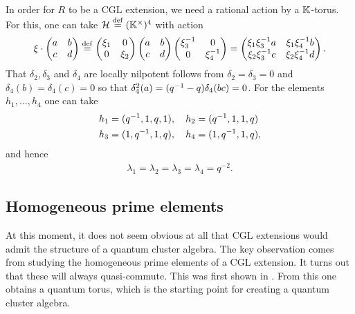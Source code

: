 \begin{example}
	In order for $R$ to be a CGL extension, we need a rational action by a $\mathbb{K}$-torus.
	For this, one can take $\mathcal{H} \overset{\mathrm{def}}{=} (\mathbb{K}^\times)^4$ with action
	\begin{equation*}
		\xi \cdot \begin{pmatrix}
			a & b \\
			c & d
		\end{pmatrix}
		\overset{\mathrm{def}}{=} \begin{pmatrix}
			\xi_1 & 0     \\
			0     & \xi_2
		\end{pmatrix}
		\begin{pmatrix}
			a & b \\
			c & d
		\end{pmatrix}
		\begin{pmatrix}
			\xi_3^{-1} & 0         \\
			0         & \xi_4^{-1}
		\end{pmatrix}
		= \begin{pmatrix}
			\xi_1\xi_3^{-1} a & \xi_1\xi_4^{-1} b \\
			\xi_2\xi_3^{-1} c & \xi_2\xi_4^{-1} d
		\end{pmatrix}.
	\end{equation*}
	That $\delta_2, \delta_3$ and $\delta_4$ are locally nilpotent follows from $\delta_2 =
		\delta_3 = 0$ and $\delta_4(b) = \delta_4(c) = 0$ so that $\delta_4^2(a) = (q^{-1} -
		q)\delta_4(bc) = 0$. For the elements $h_1, \dots, h_4$ one can take
	\begin{align*}
		 & h_1 = (q^{-1}, 1, q, 1),\quad h_2 = (q^{-1}, 1,1,q) \\
		 & h_3 = (1,q^{-1},1,q),\quad h_4 =(1,q^{-1}, 1, q),
	\end{align*}
	and hence
	\begin{align*}
		\lambda_1 = \lambda_2 = \lambda_3 = \lambda_4 = q^{-2}.
	\end{align*}
\end{example}

\subsection{Homogeneous prime elements}

At this moment, it does not seem obvious at all that CGL extensions would admit the
structure of a quantum cluster algebra. The key observation comes from studying the
homogeneous prime elements of a CGL extension. It turns out that these will always
quasi-commute. This was first shown in \cite{GoodearlYakimov2016QuantumOre}. From this
one obtains a quantum torus, which is the starting point for creating a quantum cluster
algebra.

